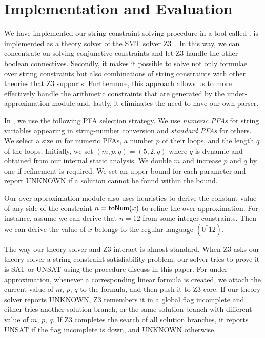 \section{Implementation and Evaluation}
\label{section:evaluation}

We have implemented our string constraint solving procedure in a tool called {\tool}. {\tool} is implemented as a theory solver of the SMT solver Z3~\cite{z3}. In this way, we can concentrate on solving conjunctive constraints and let Z3 handle the other boolean connectives. Secondly, it makes it possible to solve not only formulae over string constraints but also combinations of string constraints with other theories that Z3 supports. Furthermore, this approach allows us to more effectively handle the arithmetic constraints that are generated by the under-approximation module and, lastly, it eliminates the need to have our own parser. 

In {\tool}, we use the following PFA selection strategy. We use \emph{numeric PFAs} for string variables appearing in string-number conversion and \emph{standard PFAs} for others. We select a size $m$ for numeric PFAs, a number $p$ of their loops, and the length $q$ of the loops. Initially, we set $(m,p,q)=(5,2,q)$ where $q$ is dynamic and obtained from our internal static analysis. We double $m$ and increase $p$ and $q$ by one if refinement is required. We set an upper bound for each parameter and report UNKNOWN if a solution cannot be found within the bound.

Our over-approximation module also uses heuristics to derive the constant value of any side of the constraint $n=\mbox{\textsf{toNum}($x$)}$ to refine the over-approximation. For instance, assume we can derive that $n=12$ from some integer constraints. Then we can derive the value of $x$ belongs to the regular language $(0^*12)$. 

The way our theory solver and Z3 interact is almost standard. When Z3 asks our theory solver a string constraint satisfiability problem, our solver tries to prove it is SAT or UNSAT using the procedure discuss in this paper. For under-approximation, whenever a corresponding linear formula is created, we attach the current value of $m$, $p$, $q$ to the formula, and then push it to Z3 core. If our theory solver reports UNKNOWN, Z3 remembers it in a global flag \textsf{incomplete} and either tries another solution branch, or the same solution branch with different value of $m$, $p$, $q$. If Z3 completes the search of all solution branches, it reports UNSAT if the flag \textsf{incomplete} is down, and UNKNOWN otherwise.


